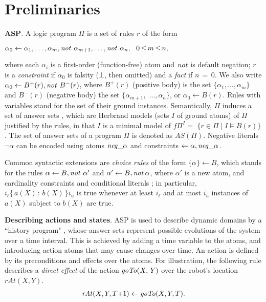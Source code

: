 \documentclass{new_tlp}
\newcommand{\citeBNselfYB}[2]{({#1} \citeyear{#2})}
\newcommand{\nqbls}{\vspace*{-0.25\baselineskip}}
\newcommand{\leanparagraph}[1]{\smallskip\noindent\textbf{#1}. }
\def\mi#1{\mathit{#1\/}}
\def\ba{\begin{array}}
\def\ea{\end{array}}
\def\beq{\begin{equation}}
\def\eeq#1{\label{#1}\end{equation}}
\begin{document}
\section{Preliminaries}

\leanparagraph{ASP} A logic program $\Pi$ is a set of rules $r$ of the form

\smallskip

\centerline{$\alpha_0 \leftarrow \alpha_1,\dots,\alpha_m,\mi{not}\
\alpha_{m+1},\dots,\mi{not}\ \alpha_n,\ \ 0\,{\leq}\, m \,{\leq}\, n,$}

\smallskip

\noindent where each $\alpha_i$ is a first-order (function-free) atom and 
$\mi{not}$
is default negation; $r$ is a \emph{constraint}
if $\alpha_0$ is falsity ($\bot$, then omitted) and a \emph{fact}  if
$n\,{=}\,0$. We also write $\alpha_0 \leftarrow B^+(r),\mi{not}\ B^-(r)$,
where $B^+(r)$ (positive body) is the set $\{\alpha_1, \dots,
\alpha_m\}$ and $B^-(r)$ (negative body) the set
$\{\alpha_{m+1},$ $\dots,\alpha_n\}$, 
or $\alpha_0 {\leftarrow} B(r)$.
Rules with variables 
stand for the set of their ground instances. 
Semantically, 
$\Pi$ induces a set of answer sets
\cite{gelfond1991classical}, which
are Herbrand models (sets $I$ of ground atoms) of $\Pi$ 
justified
by the rules, 
in that $I$ is a minimal model of $f\Pi^I=$ $\{ r \in \Pi
\mid I \models B(r)\}$
\cite{FLP04}.
The set of answer sets of a program $\Pi$ is denoted as $AS(\Pi)$. 
Negative literals $\neg \alpha$ can be 
encoded 
using atoms $\mi{neg}\_\alpha$ and
constraints $\leftarrow \alpha,\mi{neg}\_\alpha$.

 

Common syntactic extensions are \emph{choice rules} of the form
$\{\alpha\} \leftarrow B$, which stands for the rules $\alpha \leftarrow
B, \mi{not}\ \alpha'$ and $\alpha' \leftarrow B, \mi{not}\, \alpha$, where $\alpha'$ is a
new atom, and cardinality constraints and conditional
literals %
\cite{simons2002extending}; in particular, $i_\ell\{\,a(X)\,{:}\,b(X)\,\}i_u$ is true whenever at least $i_\ell$ and at most $i_u$ instances of $a(X)$ subject to $b(X)$ are true.

\leanparagraph{Describing actions and states} 
%
ASP is used to describe dynamic domains by a ``history
program" \cite{lif99c}, 
whose answer sets represent
possible evolutions of the system over a 
time interval. This is
achieved by adding a time variable to the atoms, and
introducing action atoms that may cause changes
over time. An action is defined by its preconditions and effects over the
atoms. For illustration, the following rule describes a \emph{direct effect} of the
action $\mi{goTo(X,Y)}$ over the robot's location $rAt(X,Y)$.%
\nqbls
\beq \ba l
\mi{rAt}(X,Y,T{+}1) \leftarrow \mi{goTo}(X,Y,T).
\ea \eeq {eq:direct}
\vspace*{-1.5\baselineskip}
\end{document}
